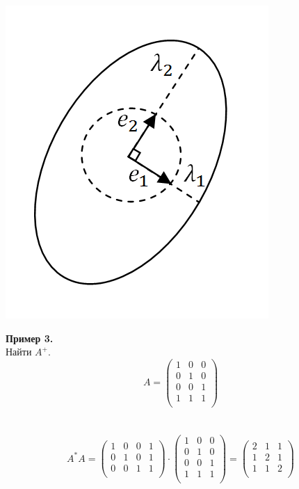 \documentclass[12pt]{article}
\theoremstyle{definition}
\numberwithin{equation}{section}
\begin{document}
	\begin{center} \includegraphics[scale=0.5]{l1_2}\end{center}
	\textbf{Пример 3.}\\
	Найти $A^+$.\\
	\[A = \begin{pmatrix}
	1 & 0 & 0 \\         
	0 & 1 & 0 \\
	0 & 0 & 1 \\
	1 & 1 & 1 \\
	\end{pmatrix}\]\\
	\\
	\[A^*A = \begin{pmatrix}
	1 & 0 & 0 & 1 \\         
	0 & 1 & 0 & 1\\
	0 & 0 & 1 & 1\\
	\end{pmatrix} \cdot \begin{pmatrix}
	1 & 0 & 0 \\         
	0 & 1 & 0 \\
	0 & 0 & 1 \\
	1 & 1 & 1 \\
	\end{pmatrix} = \begin{pmatrix}
	2 & 1 & 1 \\         
	1 & 2 & 1 \\
	1 & 1 & 2 \\
	\end{pmatrix}\]\\
\end{document}
